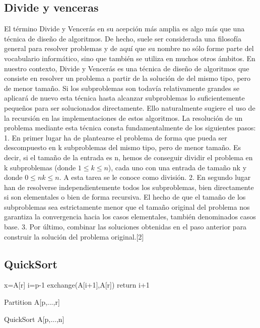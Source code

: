 \documentclass[spanish]{article}
\begin{document}
	\subsection{Divide y venceras}	
	El  término  Divide  y  Vencerás  en  su  acepción  más  amplia  es  algo  más  que  una  técnica  de  diseño  de  algoritmos.  De  hecho,  suele  ser  considerada  una  filosofía  general  para  resolver  problemas  y  de  aquí  que  su  nombre  no  sólo  forme  parte  del  vocabulario informático, sino que también se utiliza en muchos otros ámbitos.      En nuestro contexto, Divide y Vencerás es una técnica de diseño de algoritmos que  consiste  en  resolver  un  problema  a  partir  de  la  solución  de    del  mismo tipo, pero de menor tamaño. Si los subproblemas son todavía relativamente grandes   se   aplicará   de   nuevo   esta   técnica   hasta   alcanzar   subproblemas   lo   suficientemente  pequeños  para  ser  solucionados  directamente.  Ello  naturalmente  sugiere el uso de la recursión en las implementaciones de estos algoritmos.       La  resolución  de  un  problema  mediante  esta  técnica  consta  fundamentalmente  de los siguientes pasos: 1.   En   primer   lugar   ha   de   plantearse   el   problema   de   forma   que   pueda   ser   descompuesto  en  k  subproblemas  del  mismo  tipo,  pero  de  menor  tamaño.  Es  decir, si el tamaño de la entrada es n, hemos de conseguir dividir el problema en k  subproblemas  (donde  $1\leq k \leq n$),  cada  uno  con  una  entrada  de  tamaño  nk  y  donde $0\leq nk \leq n$. A esta tarea se le conoce como división. 2.    En    segundo    lugar    han    de    resolverse    independientemente    todos    los    subproblemas,  bien  directamente  si  son  elementales  o  bien  de  forma  recursiva.  El hecho de que el tamaño de los subproblemas sea estrictamente menor que el tamaño  original  del  problema  nos  garantiza  la  convergencia  hacia  los  casos  elementales, también denominados casos base. 3.  Por  último,  combinar las soluciones obtenidas en el paso anterior para construir la solución del problema original.[2]	
	\subsection*{QuickSort}	
	\begin{algorithm}[H]
		x=A[r]\;
		i=p-1\;
		exchange(A[i+1],A[r])\;
		return i+1\;
		\caption{Partition A[p,...,r]}
	\end{algorithm}
	\begin{algorithm}[H]
		\caption{QuickSort A[p,...,n]}
	\end{algorithm}
\end{document}

